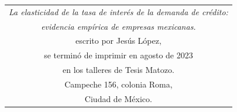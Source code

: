 \documentclass[11pt, oneside]{book}
\begin{document}





%
%
%
%
%
%
%
%
%
%
%
%
%
%
%
%
%
%
%
%
%
%
%
%
%
%
%
%
%
%
%
%
%

\newpage
\thispagestyle{empty}
\begin{table}[p]
\centering
\small
\label{ed}
\begin{tabular}{c}
\textit{La elasticidad de la tasa de interés de la demanda de crédito:} \\ \textit{evidencia empírica de empresas mexicanas.}\\ escrito por Jesús López,\\ se terminó de imprimir en agosto de 2023\\ en los talleres de Tesis Matozo.\\ Campeche 156, colonia Roma,\\ Ciudad de México.
\end{tabular}
\end{table}


\end{document}
